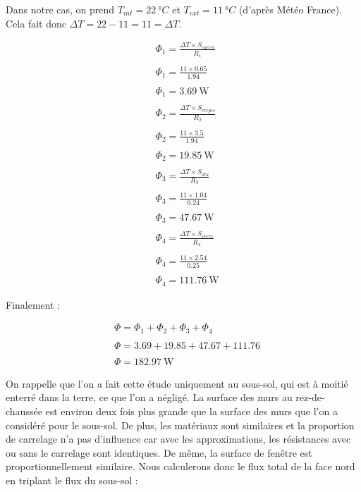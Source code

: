 \documentclass[12pt, a4paper]{article}
\newcommand{\TInt}{\ensuremath{T_{int}}}
\newcommand{\TExt}{\ensuremath{T_{ext}}}
\newcommand{\RUn}{\ensuremath{R_{1}}}
\newcommand{\RDeux}{\ensuremath{R_{2}}}
\newcommand{\RTrois}{\ensuremath{R_{3}}}
\newcommand{\RQuatre}{\ensuremath{R_{4}}}
\newcommand{\phiUn}{\ensuremath{\Phi_{1}}}
\newcommand{\phiDeux}{\ensuremath{\Phi_{2}}}
\newcommand{\phiTrois}{\ensuremath{\Phi_{3}}}
\newcommand{\phiQuatre}{\ensuremath{\Phi_{4}}}
\newcommand{\deltaT}{\ensuremath{\Delta T}}
\newcommand{\SCarrel}{\ensuremath{S_{carrel}}}
\newcommand{\SCrepis}{\ensuremath{S_{crepis}}}
\newcommand{\SAlu}{\ensuremath{S_{alu}}}
\newcommand{\SVerre}{\ensuremath{S_{verre}}}
\begin{document}
Dans notre cas, on prend $\TInt = \SI{22}{\degree C}$ et $\TExt = \SI{11}{\degree C}$ (d'après Météo France). Cela fait donc $\deltaT = 22 - 11 = \boxed{11 = \deltaT}$.

\begin{align*}
 & \phiUn = \frac{\deltaT \times \SCarrel}{\RUn} \\ \\
 & \phiUn = \frac{11 \times 0.65}{1.94} \\ \\
 & \boxed{\phiUn = \SI{3.69}{\watt}} \\ \\
 & \phiDeux = \frac{\deltaT \times \SCrepis}{\RDeux} \\ \\
 & \phiDeux = \frac{11 \times 3.5}{1.94} \\ \\
 & \boxed{\phiDeux = \SI{19.85}{\watt}} \\ \\
 & \phiTrois = \frac{\deltaT \times \SAlu}{\RTrois} \\ \\
 & \phiTrois = \frac{11 \times 1.04}{0.24} \\ \\
 & \boxed{\phiTrois = \SI{47.67}{\watt}} \\ \\
 & \phiQuatre = \frac{\deltaT \times \SVerre}{\RQuatre} \\ \\
 & \phiQuatre = \frac{11 \times 2.54}{0.25} \\ \\
 & \boxed{\phiQuatre = \SI{111.76}{\watt}}
\end{align*}

\bigskip

Finalement :

\begin{align*}
 & \Phi = \phiUn + \phiDeux + \phiTrois + \phiQuatre \\ \\
 & \Phi = 3.69 + 19.85 + 47.67 + 111.76 \\ \\
 & \boxed{\Phi = \SI{182.97}{\watt}}
\end{align*}

\bigskip

On rappelle que l'on a fait cette étude uniquement au sous-sol, qui est à moitié enterré dans la terre, ce que l'on a négligé. La surface des murs au rez-de-chaussée est environ deux fois plus grande que la surface des murs que l'on a considéré pour le sous-sol. De plus, les matériaux sont similaires et la proportion de carrelage n'a pas d'influence car avec les approximations, les résistances avec ou sans le carrelage sont identiques. De même, la surface de fenêtre est proportionnellement similaire. Nous calculerons donc le flux total de la face nord en triplant le flux du sous-sol :
\end{document}
